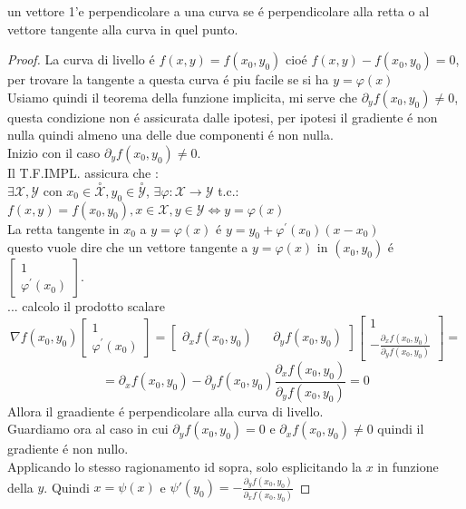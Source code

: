 \observation
un vettore 1'e perpendicolare a una curva se \'e perpendicolare alla retta o al vettore tangente alla curva in quel punto.
\begin{proof}
	La curva di livello \'e $f(x,y)=f(x_0,y_0)$ cio\'e $f(x,y)-f(x_0,y_0)=0$, per trovare la tangente a questa curva \'e piu facile se si ha $y=\varphi(x)$\\
	Usiamo quindi il teorema della funzione implicita, mi serve che $\partial_yf(x_0,y_0)\ne 0$, questa condizione non \'e assicurata dalle ipotesi, per ipotesi il gradiente \'e non nulla quindi almeno una delle due componenti \'e non nulla.\\
	Inizio con il caso $\partial_yf(x_0,y_0)\ne 0$.\\
	Il T.F.IMPL. assicura che :\\
	$\exists\mathcal{X},\mathcal{Y}$ con $x_0\in\overset{\circ}{\mathcal{X}}, y_0\in\overset{\circ}{\mathcal{Y}}$, $\exists\varphi:\mathcal{X}\rightarrow\mathcal{Y}$ t.c.:\\
	$f(x,y)=f(x_0,y_0), x\in\mathcal{X}, y\in\mathcal{Y} \Leftrightarrow y=\varphi(x)$\\
	La retta tangente in $x_0$ a $y=\varphi(x)$ \'e $y=y_0+\varphi^{'}(x_0)(x-x_0)$\\
	questo vuole dire che un vettore tangente a $y=\varphi(x)$ in $(x_0,y_0)$ \'e $\begin{bmatrix}1\\\varphi^{'}(x_0)\end{bmatrix}$.\\
	... calcolo il prodotto scalare\\
	$$\nabla f(x_0,y_0)\begin{bmatrix}1\\\varphi^{'}(x_0)\end{bmatrix} = \begin{bmatrix}\partial_x f(x_0,y_0)&&\partial_y f(x_0,y_0)\end{bmatrix}\begin{bmatrix}1\\-\frac{\partial_x f(x_0,y_0)}{\partial_y f(x_0,y_0)}\end{bmatrix} =$$ 
	$$=\partial_x f(x_0,y_0) -\partial_y f(x_0,y_0)\frac{\partial_x f(x_0,y_0)}{\partial_y f(x_0,y_0)}=0$$
	Allora il graadiente \'e perpendicolare alla curva di livello.\\
	Guardiamo ora al caso in cui $\partial_yf(x_0,y_0)= 0$ e $\partial_xf(x_0,y_0)\ne 0$ quindi il gradiente \'e non nullo.\\
	Applicando lo stesso ragionamento id sopra, solo esplicitando la $x$ in funzione della $y$. Quindi $x=\psi(x)$ e $\psi{'}(y_0)=-\frac{\partial_y f(x_0,y_0)}{\partial_x f(x_0,y_0)}$
\end{proof}

